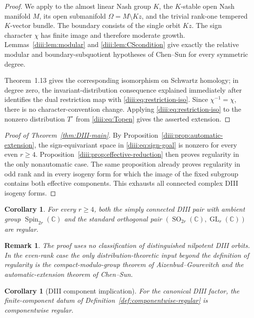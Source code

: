 \documentclass[10pt,a4paper]{amsart}
\numberwithin{equation}{section}
\newtheorem{corollary}[theorem]{Corollary}
\newtheorem{remark}[theorem]{Remark}
\newcommand{\C}{\mathbb C}
\newcommand{\Spin}{\operatorname{Spin}}
\newcommand{\SO}{\operatorname{SO}}
\newcommand{\GL}{\operatorname{GL}}
\begin{document}
\begin{proof}
We apply \cite[Theorem~1.13]{ChenSun} to the almost linear Nash group $K$, the $K$-stable open Nash manifold $M$, its open submanifold
$\Omega=M\setminus Kz$, and the trivial rank-one tempered $K$-vector bundle.
The boundary consists of the single orbit $Kz$.  The sign character $\chi$ has finite image and therefore moderate growth.  Lemmas~\ref{diii:lem:modular} and
\ref{diii:lem:CScondition} give exactly the relative modular and boundary-subquotient hypotheses of Chen--Sun for every symmetric degree.

Theorem~1.13 gives the corresponding isomorphism on Schwartz homology; in degree zero, the invariant-distribution consequence explained immediately after
\cite[Theorem~1.12]{ChenSun} identifies the dual restriction map with
\eqref{diii:eq:restriction-iso}.  Since $\chi^{-1}=\chi$, there is no character-convention change.  Applying \eqref{diii:eq:restriction-iso} to the nonzero distribution
$T^\circ$ from \eqref{diii:eq:Topen} gives the asserted extension.
\end{proof}

\begin{proof}[Proof of Theorem~\ref{thm:DIII-main}]
By Proposition~\ref{diii:prop:automatic-extension}, the sign-equivariant space in
\eqref{diii:eq:sign-goal} is nonzero for every even $r\ge4$.  Proposition~\ref{diii:prop:effective-reduction} then proves regularity in the only nonautomatic case.  The same proposition already proves regularity in odd rank and in every isogeny form for which the image of the fixed subgroup contains both effective components.  This exhausts all connected complex DIII isogeny forms.
\end{proof}

\begin{corollary}\label{diii:cor:standard-forms}
For every $r\ge4$, both the simply connected DIII pair with ambient group
$\Spin_{2r}(\C)$ and the standard orthogonal pair
$(\SO_{2r}(\C),\GL_r(\C))$ are regular.
\end{corollary}

\begin{remark}
The proof uses no classification of distinguished nilpotent DIII orbits.  In the even-rank case the only distribution-theoretic input beyond the definition of regularity is the compact-modulo-group theorem of Aizenbud--Gourevitch and the automatic-extension theorem of Chen--Sun.
\end{remark}


\begin{corollary}[DIII component implication]\label{cor:DIII-component}
For the canonical DIII factor, the finite-component datum of
Definition~\ref{def:componentwise-regular} is componentwise regular.
\end{corollary}
\end{document}
